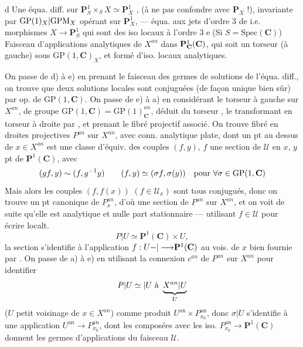 \textcircled{d}\quad Une équa. diff.  sur $\mathbf P^1_S\times_S X\simeq\mathbf P^1_X$ , (à ne pas confondre avec $\mathbf P_X$ !), invariante par ${\mathrm{GP}(1)_X|\mathrm{GPM}_X}$ opérant sur $\mathbf P^1_X$, --- équa.  aux jets d'ordre 3 de  i.e. morphismes $X\longrightarrow\mathbf P^1_S$ qui sont des iso locaux à l'ordre 3
\textcircled{e}\quad (Si $S=\mathrm{Spec}(\mathbf C)$)  Faisceau  d'applications analytiques de $X^{an}$ dans $\mathbf P^1_{{{\mathbf C}}}(\mathbf C)$, qui soit un torseur (à gauche) sous  $\mathrm{GP}(1,\mathbf C)_X$, et formé d'iso. locaux analytiques.

On passe de d) à e) en prenant le faisceau des germes de solutions de l'équa. diff., on trouve que deux solutions locales sont conjuguées (de façon unique bien sûr) par op. de $\mathrm{GP}(1,\mathbf C)$.
On passe de e) à a) en considérant le torseur à gauche  sur $X^{an}$, de groupe $\mathrm{GP}(1,\mathbf C)=\mathrm{GP}(1)_{\mathbf C}^{an}$, déduit du torseur , le transformant en torseur à droite par , et prenant le fibré projectif associé.
On trouve fibré en droites projectives $P^{an}$ sur $X^{an}$, avec conn. analytique plate, dont un pt au dessus de $x\in X^{an}$ est une classe d'équiv. des couples $(f,y)$, $f$ une  section de $\mathcal U$ en $x$, $y$ pt de $\mathbf P^1(\mathbf C)$, avec
\[
{(gf,y)\sim(f,g^{-1}y)}\qquad(f,y)\simeq(\sigma f,\sigma(y))\quad\text{pour }\forall\sigma\in\mathrm{GP}(1,\mathbf C)
\]
Mais alors les couples $(f,f(x))$ $(f\in\mathcal U_x)$ sont tous conjugués, donc on trouve un pt canonique de $P^{an}_x$, d'où une section de $P^{an}$ sur $X^{an}$, et on voit de suite qu'elle est analytique et nulle part stationnaire --- utilisant $f\in\mathcal U$ pour écrire localt.
\[
P|U\simeq\mathbf P^1(\mathbf C)\times U,
\]
la section \inserted{$\sigma$} s'identifie à l'application $f:U{-|\longrightarrow}\mathbf P^1(\mathbf C)$ au vois. de $x$ bien fournie par .
On passe de a) à e) en utilisant la connexion $c^{an}$ de $P^{an}$ sur $X^{an}$ pour identifier
\[
{P|U\simeq|U\text{ à }}\underbrace{X^{an}|U}_{{U}}
\]
($U$ petit voisinage de $x\in X^{an}$)
comme produit $U^{\mathrm{an}}\times P_{x_0}^{\mathrm{an}}$, donc $\sigma|U$ s'identifie à une application $U^{\mathrm{an}}\longrightarrow P_{x_0}^{\mathrm{an}}$, dont les composées avec les iso. $P_{x_0}^{\mathrm{an}}\longrightarrow\mathbf P^1(\mathbf C)$ donnent les germes d'applications  du faisceau $\mathcal U$.

